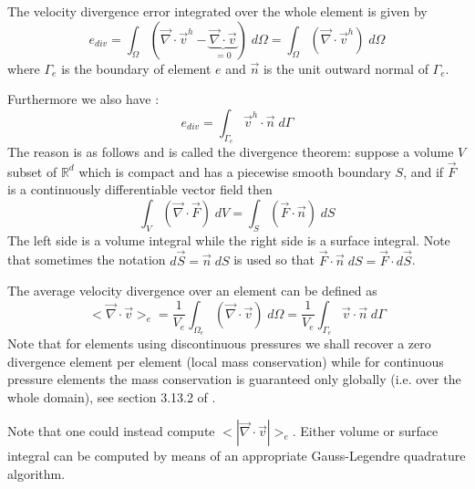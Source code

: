 
The velocity divergence error integrated over the whole element is given by
\begin{equation}
e_{div}= \int_\Omega (\vec\nabla\cdot \vec v^h - \underbrace{\vec\nabla\cdot \vec v}_{=0}  ) \; d\Omega
= \int_\Omega (\vec\nabla\cdot \vec v^h) \; d\Omega
\end{equation}
where $\Gamma_e$ is the boundary of element $e$ and $\vec{n}$ is the unit 
outward normal of $\Gamma_e$.

Furthermore we also have \cite{dobo04}:
\[
e_{div}
= \int_{\Gamma_e} \vec{v}^h\cdot\vec{n} \;  d\Gamma
\]
The reason is as follows and is called the divergence theorem:
suppose a volume $V$ subset of $\mathbb{R}^d$ which is compact
and has a piecewise smooth boundary $S$, and if $\vec F$ is
a continuously differentiable vector field then
\[
\int_V ( \vec\nabla\cdot\vec F)\; dV = \int_S (\vec F \cdot \vec n)\; dS
\]
The left side is a volume integral while the right side is a surface integral.
Note that sometimes the notation $d\vec S = \vec n \; dS $ is used so that 
$\vec F \cdot \vec n \; dS = \vec F \cdot d\vec S$.

The average velocity divergence over an element can be defined as 
\[
<\vec \nabla \cdot \vec v>_e 
= \frac{1}{V_e} \int_{\Omega_e}  (\vec\nabla\cdot\vec v) \; d\Omega
= \frac{1}{V_e} \int_{\Gamma_e} \vec{v}\cdot\vec{n} \; d\Gamma
\]
Note that for elements using discontinuous pressures we shall 
recover a zero divergence element per element (local mass conservation)
while for continuous pressure elements the mass conservation 
is guaranteed only globally (i.e. over the whole domain), see section 3.13.2 of \cite{grsa}.

Note that one could instead compute $<|\vec\nabla\cdot \vec v|>_e$. Either volume or 
surface integral can be computed by means of an appropriate Gauss-Legendre quadrature algorithm.



